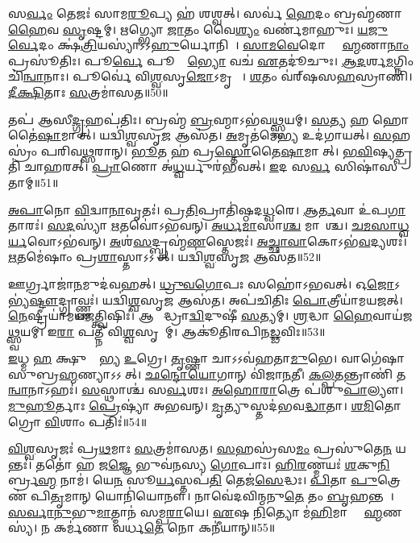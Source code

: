    𑌸\ul{𑌰𑍍𑌵𑌂} 𑌤𑍇𑌜𑌃॑ 𑌸𑌾𑌮\ul{𑌰𑍂}𑌪𑍍𑌯 𑌹॑ 𑌶𑌶𑍍𑌵𑌤𑍍।
   𑌸𑌰𑍍𑌵॑ \ul{𑌹𑍇}𑌦𑌂 𑌬𑍍𑌰𑌹𑍍𑌮॑𑌣𑌾 \ul{𑌹𑍈}𑌵 \ul{𑌸𑍃}𑌷𑍍𑌟𑌮𑍍।
   \ul{𑌋}𑌗𑍍𑌭𑍍𑌯𑍋 \ul{𑌜𑌾}𑌤𑌂 𑌵𑍈\ul{𑌶𑍍𑌯𑌂} 𑌵𑌰𑍍𑌣॑𑌮𑌾𑌹𑍁𑌃।
   \ul{𑌯}\ul{𑌜𑍁}\ul{𑌰𑍍𑌵𑍇}𑌦𑌂 𑌕𑍍𑌷॑\ul{𑌤𑍍𑌰𑌿}𑌯𑌸𑍍𑌯𑌾॑𑌽𑌽\ul{𑌹𑍁}𑌰𑍍𑌯𑍋𑌨𑌿𑌮𑍍᳚।
   \ul{𑌸𑌾}\ul{𑌮}\ul{𑌵𑍇}𑌦𑍋 𑌬𑍍𑌰𑌾᳚\ul{𑌹𑍍𑌮}𑌣𑌾\ul{𑌨𑌾𑌂} 𑌪𑍍𑌰𑌸𑍂॑𑌤𑌿𑌃।
   𑌪𑍂\ul{𑌰𑍍𑌵𑍇} 𑌪𑍂𑌰𑍍𑌵𑍇᳚\ul{𑌭𑍍𑌯𑍋} 𑌵𑌚॑ \ul{𑌏}𑌤𑌦𑍂॑𑌚𑍁𑌃।
   \ul{𑌆}\ul{𑌦}𑌰𑍍\mbox{}𑌶\ul{𑌮}𑌗𑍍𑌨𑌿𑌂 𑌚𑌿॑\ul{𑌨𑍍𑌵𑌾}𑌨𑌾𑌃।
   𑌪𑍂𑌰𑍍𑌵𑍇॑ 𑌵𑌿\ul{𑌶𑍍𑌵}𑌸𑍃\ul{𑌜𑍋}𑌽𑌮𑍃𑌤𑌾𑌃᳚।
   \ul{𑌶}𑌤𑌂 𑌵॑𑌰𑍍‌𑌷𑌸\ul{𑌹}𑌸𑍍𑌰𑌾𑌣𑌿॑।
   \ul{𑌦𑍀}\ul{𑌕𑍍𑌷𑌿}𑌤𑌾𑌃 \ul{𑌸}𑌤𑍍𑌰𑌮𑌾॑𑌸𑌤॥50॥

   𑌤𑌪॑ 𑌆𑌸𑍀\ul{𑌦𑍍𑌗𑍃}𑌹𑌪॑𑌤𑌿𑌃।
   𑌬𑍍𑌰𑌹𑍍𑌮॑ \ul{𑌬𑍍𑌰}𑌹𑍍𑌮𑌾𑌽𑌭॑𑌵\ul{𑌥𑍍𑌸𑍍𑌵}𑌯𑌮𑍍।
   \ul{𑌸}𑌤𑍍𑌯 \ul{𑌹} 𑌹𑍋𑌤𑍈॑\ul{𑌷𑌾}𑌮𑌾𑌸𑍀᳚𑌤𑍍।
   𑌯𑌦𑍍𑌵𑌿॑\ul{𑌶𑍍𑌵}𑌸𑍃\ul{𑌜} 𑌆𑌸॑𑌤।
   \ul{𑌅}𑌮𑍃𑌤॑𑌮𑍇\ul{𑌭𑍍𑌯} 𑌉𑌦॑𑌗𑌾𑌯𑌤𑍍।
   \ul{𑌸}𑌹𑌸𑍍𑌰𑌂॑ 𑌪𑌰𑌿𑌵\ul{𑌥𑍍𑌸}𑌰𑌾𑌨𑍍।
   \ul{𑌭𑍂}𑌤 𑌹॑ 𑌪𑍍𑌰\ul{𑌸𑍍𑌤𑍋}𑌤𑍈\ul{𑌷𑌾}𑌮𑌾𑌸𑍀᳚𑌤𑍍।
   \ul{𑌭}\ul{𑌵𑌿}𑌷𑍍𑌯𑌤𑍍𑌪𑍍𑌰𑌤𑌿॑ 𑌚𑌾𑌹𑌰𑌤𑍍।
   \ul{𑌪𑍍𑌰𑌾}𑌣𑍋 𑌅॑\ul{𑌧𑍍𑌵}𑌰𑍍𑌯𑍁𑌰॑𑌭𑌵𑌤𑍍।
   \ul{𑌇}𑌦 𑌸\ul{𑌰𑍍𑌵}\ul{} 𑌸𑌿𑌷𑌾॑𑌸𑌤𑌾𑌮𑍍॥51॥

   \ul{𑌅}\ul{𑌪𑌾}𑌨𑍋 \ul{𑌵𑌿}𑌦𑍍𑌵𑌾\ul{𑌨𑌾}𑌵𑍃𑌤𑌃॑।
   𑌪𑍍𑌰\ul{𑌤𑌿}𑌪𑍍𑌰𑌾𑌤𑌿॑𑌷𑍍𑌠𑌦\ul{𑌧𑍍𑌵}𑌰𑍇।
   \ul{𑌆}\ul{𑌰𑍍𑌤}𑌵𑌾 𑌉॑𑌪\ul{𑌗𑌾}𑌤𑌾𑌰𑌃॑।
   \ul{𑌸}\ul{𑌦}𑌸𑍍𑌯𑌾॑ \ul{𑌋}𑌤𑌵𑍋॑𑌽𑌭𑌵𑌨𑍍।
   \ul{𑌅}\ul{𑌰𑍍𑌧}\ul{𑌮𑌾}𑌸𑌾\ul{𑌶𑍍𑌚} 𑌮𑌾𑌸𑌾᳚𑌶𑍍𑌚।
   \ul{𑌚}\ul{𑌮}\ul{𑌸𑌾}\ul{𑌧𑍍𑌵}\ul{𑌰𑍍𑌯}𑌵𑍋𑌽𑌭॑𑌵𑌨𑍍।
   \ul{𑌅}𑌶॑\ul{𑌸}𑌦𑍍𑌬𑍍𑌰𑌹𑍍𑌮॑\ul{𑌣}𑌸𑍍𑌤𑍇𑌜𑌃॑।
   \ul{𑌅}\ul{𑌚𑍍𑌛𑌾}\ul{𑌵𑌾}𑌕𑍋𑌽𑌭॑\ul{𑌵}𑌦𑍍𑌯𑌶𑌃॑।
   \ul{𑌋}𑌤𑌮𑍇॑𑌷𑌾𑌂 𑌪𑍍𑌰\ul{𑌶𑌾}𑌸𑍍𑌤𑌾𑌽𑌽𑌸𑍀᳚𑌤𑍍।
   𑌯𑌦𑍍𑌵𑌿॑\ul{𑌶𑍍𑌵}𑌸𑍃\ul{𑌜} 𑌆𑌸॑𑌤॥52॥

   𑌊𑌰𑍍𑌗𑍍𑌰𑌾𑌜𑌾॑\ul{𑌨}𑌮𑍁𑌦॑𑌵𑌹𑌤𑍍।
   \ul{𑌧𑍍𑌰𑍁}\ul{𑌵}\ul{𑌗𑍋}𑌪𑌃 𑌸𑌹𑍋॑𑌽𑌭𑌵𑌤𑍍।
   𑌓\ul{𑌜𑍋}𑌽𑌭𑍍𑌯॑\ul{𑌷𑍍𑌟𑍗}\-𑌦𑍍𑌗𑍍𑌰𑌾𑌵𑍍𑌣𑍍𑌣𑌃॑।
   𑌯𑌦𑍍𑌵𑌿॑\ul{𑌶𑍍𑌵}𑌸𑍃\ul{𑌜} 𑌆𑌸॑𑌤।
   𑌅𑌪॑𑌚𑌿𑌤𑌿𑌃 \ul{𑌪𑍋}𑌤𑍍𑌰𑍀𑌯𑌾॑𑌮𑌯𑌜𑌤𑍍।
   \ul{𑌨𑍇}𑌷𑍍𑌟𑍍𑌰𑍀𑌯𑌾॑𑌮\-𑌯\ul{𑌜}𑌤𑍍𑌤𑍍𑌵𑌿𑌷𑌿𑌃॑।
   𑌆𑌗𑍍𑌨𑍀᳚𑌦𑍍𑌧𑍍𑌰𑌾\ul{𑌦𑍍𑌵𑌿}𑌦𑍁𑌷𑍀॑ \ul{𑌸}𑌤𑍍𑌯𑌮𑍍।
   \ul{𑌶𑍍𑌰}𑌦𑍍𑌧𑌾 \ul{𑌹𑍈}𑌵𑌾𑌯॑𑌜\ul{𑌥𑍍𑌸𑍍𑌵}𑌯𑌮𑍍।
   𑌇\ul{𑌰𑌾} 𑌪𑌤𑍍𑌨𑍀॑ 𑌵𑌿\ul{𑌶𑍍𑌵}𑌸𑍃𑌜𑌾᳚𑌮𑍍।
   𑌆𑌕𑍂॑𑌤𑌿𑌰𑌪𑌿𑌨\-\ul{𑌡𑍍𑌢}𑌵𑌿𑌃॥53॥

   \ul{𑌇}𑌧𑍍𑌮 \ul{𑌹} 𑌕𑍍𑌷𑍁𑌚𑍍𑌚𑍈᳚𑌭𑍍𑌯 \ul{𑌉}𑌗𑍍𑌰𑍇।
   \ul{𑌤𑍃}𑌷𑍍𑌣𑌾 𑌚𑌾𑌽𑌽𑌵॑𑌹𑌤𑌾\ul{𑌮𑍁}𑌭𑍇।
   𑌵𑌾𑌗𑍇॑𑌷𑌾 𑌸𑍁𑌬𑍍𑌰\ul{𑌹𑍍𑌮}𑌣𑍍𑌯𑌾𑌽𑌽𑌸𑍀᳚𑌤𑍍।
   \ul{𑌛}\ul{𑌨𑍍𑌦𑍋}\ul{𑌯𑍋}𑌗𑌾𑌨𑍍 𑌵𑌿॑𑌜𑌾\ul{𑌨}𑌤𑍀।
   \ul{𑌕}\ul{𑌲𑍍𑌪}\ul{𑌤}𑌨𑍍𑌤𑍍𑌰𑌾𑌣𑌿॑ 𑌤\ul{𑌨𑍍𑌵𑌾}𑌨𑌾𑌽𑌹𑌃॑।
   \ul{𑌸}\ul{}𑌸𑍍𑌥𑌾𑌶𑍍𑌚॑ 𑌸\ul{𑌰𑍍𑌵}𑌶𑌃।
   \ul{𑌅}\ul{𑌹𑍋}\ul{𑌰𑌾}𑌤𑍍𑌰𑍇 𑌪॑𑌶𑍁\ul{𑌪𑌾}𑌲𑍍𑌯𑍗।
   \ul{𑌮𑍁}\ul{𑌹𑍂}𑌰𑍍𑌤𑌾𑌃 \ul{𑌪𑍍𑌰𑍇}𑌷𑍍𑌯𑌾॑ 𑌅𑌭𑌵𑌨𑍍।
   \ul{𑌮𑍃}𑌤𑍍𑌯𑍁𑌸𑍍𑌤𑌦॑𑌭𑌵\ul{𑌦𑍍𑌧𑌾}𑌤𑌾।
   \ul{𑌶}\ul{𑌮𑌿}𑌤𑍋𑌗𑍍𑌰𑍋 \ul{𑌵𑌿}𑌶𑌾𑌂 𑌪𑌤𑌿𑌃॑॥54॥

   \ul{𑌵𑌿}\ul{𑌶𑍍𑌵}𑌸𑍃𑌜𑌃॑ 𑌪𑍍𑌰\ul{𑌥}𑌮𑌾𑌃 \ul{𑌸}𑌤𑍍𑌰𑌮𑌾॑𑌸𑌤।
   \ul{𑌸}𑌹𑌸𑍍𑌰॑𑌸\ul{𑌮𑌂} 𑌪𑍍𑌰𑌸𑍁॑𑌤𑍇\ul{𑌨} 𑌯𑌨𑍍𑌤𑌃॑।
   𑌤𑌤𑍋॑ 𑌹 𑌜\ul{𑌜𑍍𑌞𑍇} 𑌭𑍁𑌵॑𑌨𑌸𑍍𑌯 \ul{𑌗𑍋}𑌪𑌾𑌃।
   \ul{𑌹𑌿}\ul{𑌰}𑌣𑍍𑌮𑌯𑌃॑ \ul{𑌶}𑌕𑍁\ul{𑌨𑌿}𑌰𑍍𑌬𑍍𑌰\ul{𑌹𑍍𑌮} 𑌨𑌾𑌮॑।
   𑌯𑍇\ul{𑌨} 𑌸𑍂\ul{𑌰𑍍𑌯}𑌸𑍍𑌤𑌪॑\ul{𑌤𑌿} 𑌤𑍇𑌜॑\ul{𑌸𑍇}𑌦𑍍𑌧𑌃।
   \ul{𑌪𑌿}𑌤𑌾 \ul{𑌪𑍁}𑌤𑍍𑌰𑍇𑌣॑ 𑌪𑌿\ul{𑌤𑍃}𑌮𑌾𑌨𑍍 𑌯𑍋𑌨𑌿॑𑌯𑍋𑌨𑍗।
   𑌨𑌾𑌵𑍇॑𑌦𑌵𑌿𑌨𑍍𑌮𑌨𑍁\ul{𑌤𑍇} 𑌤𑌂 \ul{𑌬𑍃}𑌹𑌨𑍍𑌤𑌮𑍍᳚।
   \ul{𑌸}\ul{𑌰𑍍𑌵𑌾}\ul{𑌨𑍁}𑌭𑍁\ul{𑌮𑌾}𑌤𑍍𑌮𑌾𑌨॑ 𑌸𑌮𑍍𑌪\ul{𑌰𑌾}𑌯𑍇।
   \ul{𑌏}𑌷 \ul{𑌨𑌿}𑌤𑍍𑌯𑍋 𑌮॑\ul{𑌹𑌿}𑌮𑌾 𑌬𑍍𑌰𑌾᳚\ul{𑌹𑍍𑌮}𑌣𑌸𑍍𑌯॑।
   𑌨 𑌕𑌰𑍍𑌮॑𑌣𑌾 𑌵𑌰𑍍𑌧\ul{𑌤𑍇} 𑌨𑍋 𑌕𑌨𑍀॑𑌯𑌾𑌨𑍍॥55॥

